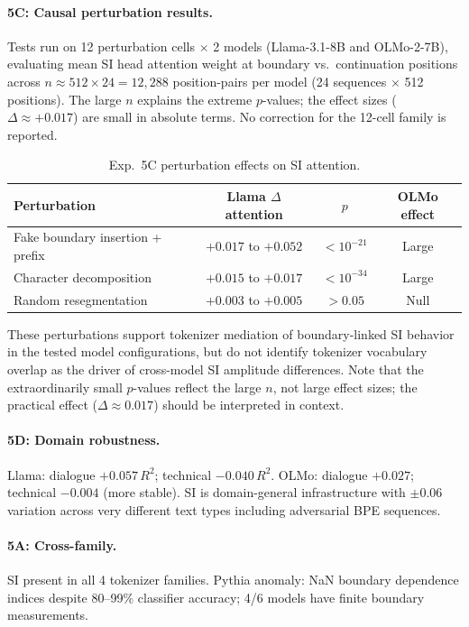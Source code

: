 \documentclass{article}
\begin{document}
\paragraph{5C: Causal perturbation results.} Tests run on 12 perturbation cells $\times$ 2
models (Llama-3.1-8B and OLMo-2-7B), evaluating mean SI head attention weight at boundary
vs.\ continuation positions across $n \approx 512 \times 24 = 12{,}288$ position-pairs per
model (24 sequences $\times$ 512 positions). The large $n$ explains the extreme $p$-values; the
effect sizes ($\Delta \approx +0.017$) are small in absolute terms. No correction for the
12-cell family is reported.
\begin{table}[htbp]
    \caption{Exp.~5C perturbation effects on SI attention.}
    \centering
    \small
    \begin{tabular}{lccc}
        \toprule
        Perturbation & Llama $\Delta$ attention & $p$ & OLMo effect \\
        \midrule
        Fake boundary insertion + prefix & $+0.017$ to $+0.052$ & $< 10^{-21}$ & Large \\
        Character decomposition & $+0.015$ to $+0.017$ & $< 10^{-34}$ & Large \\
        Random resegmentation & $+0.003$ to $+0.005$ & $> 0.05$ & Null \\
        \bottomrule
    \end{tabular}
\end{table}

These perturbations support tokenizer mediation of boundary-linked SI behavior in the
tested model configurations, but do not identify tokenizer vocabulary overlap as the
driver of cross-model SI amplitude differences. Note that the extraordinarily small
$p$-values reflect the large $n$, not large effect sizes; the practical effect
($\Delta \approx 0.017$) should be interpreted in context.

\paragraph{5D: Domain robustness.} Llama: dialogue $+0.057\, R^2$; technical $-0.040\, R^2$.
OLMo: dialogue $+0.027$; technical $-0.004$ (more stable). SI is domain-general infrastructure
with $\pm 0.06$ variation across very different text types including adversarial BPE sequences.

\paragraph{5A: Cross-family.} SI present in all 4 tokenizer families. Pythia anomaly: NaN
boundary dependence indices despite 80--99\% classifier accuracy; 4/6 models have finite
boundary measurements.
\end{document}
